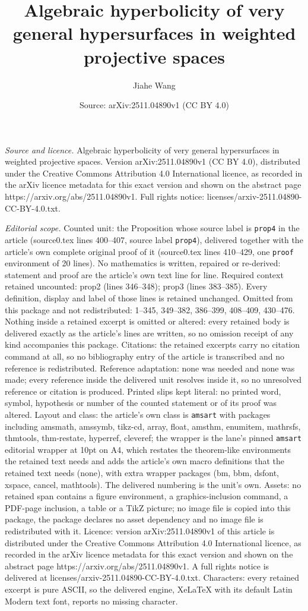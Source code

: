 \documentclass[10pt,a4paper]{amsart}
\title[Algebraic hyperbolicity of very general hypersurfaces in wei]{Algebraic hyperbolicity of very general hypersurfaces in weighted projective spaces}
\author{Jiahe Wang}
\date{Source: arXiv:2511.04890v1 (CC BY 4.0)}
\begin{document}
\maketitle

\noindent\emph{Source and licence.} Algebraic hyperbolicity of very general hypersurfaces in weighted projective spaces. Version arXiv:2511.04890v1 (CC BY 4.0), distributed under the Creative Commons Attribution 4.0 International licence, as recorded in the arXiv licence metadata for this exact version and shown on the abstract page https://arxiv.org/abs/2511.04890v1. Full rights notice: licenses/arxiv-2511.04890-CC-BY-4.0.txt.\par\smallskip

\noindent\textit{Editorial scope.} Counted unit: the Proposition whose source label is \texttt{prop4} in the article (source0.tex lines 400--407, source label \texttt{prop4}), delivered together with the article's own complete original proof of it (source0.tex lines 410--429, one \texttt{proof} environment of 20 lines). No mathematics is written, repaired or re-derived: statement and proof are the article's own text line for line. Required context retained uncounted: prop2 (lines 346--348); prop3 (lines 383--385). Every definition, display and label of those lines is retained unchanged. Omitted from this package and not redistributed: 1--345, 349--382, 386--399, 408--409, 430--476. Nothing inside a retained excerpt is omitted or altered: every retained body is delivered exactly as the article's lines are written, so no omission receipt of any kind accompanies this package. Citations: the retained excerpts carry no citation command at all, so no bibliography entry of the article is transcribed and no reference is redistributed. Reference adaptation: none was needed and none was made; every reference inside the delivered unit resolves inside it, so no unresolved reference or citation is produced. Printed slips kept literal: no printed word, symbol, hypothesis or number of the counted statement or of its proof was altered. Layout and class: the article's own class is \texttt{amsart} with packages including amsmath, amssymb, tikz-cd, array, float, amsthm, enumitem, mathrsfs, thmtools, thm-restate, hyperref, cleveref; the wrapper is the lane's pinned \texttt{amsart} editorial wrapper at 10pt on A4, which restates the theorem-like environments the retained text needs and adds the article's own macro definitions that the retained text needs (none), with extra wrapper packages (bm, bbm, dsfont, xspace, cancel, mathtools). The delivered numbering is the unit's own. Assets: no retained span contains a figure environment, a graphics-inclusion command, a PDF-page inclusion, a table or a TikZ picture; no image file is copied into this package, the package declares no asset dependency and no image file is redistributed with it. Licence: version arXiv:2511.04890v1 of this article is distributed under the Creative Commons Attribution 4.0 International licence, as recorded in the arXiv licence metadata for this exact version and shown on the abstract page https://arxiv.org/abs/2511.04890v1. A full rights notice is delivered at licenses/arxiv-2511.04890-CC-BY-4.0.txt. Characters: every retained excerpt is pure ASCII, so the delivered engine, XeLaTeX with its default Latin Modern text font, reports no missing character.
\end{document}
